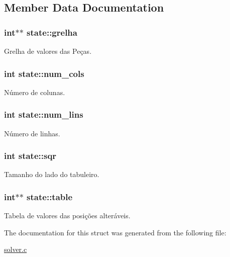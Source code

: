 \subsection{Member Data Documentation}
\hypertarget{structstate_a38d05acc88f631f12c61832a59232fb7}{
\subsubsection[{grelha}]{\setlength{\rightskip}{0pt plus 5cm}int$\ast$$\ast$ state\+::grelha}}\label{structstate_a38d05acc88f631f12c61832a59232fb7}
Grelha de valores das Peças. \hypertarget{structstate_a7fd2fa9e464accceb3da4c76e2198c56}{
\subsubsection[{num\+\_\+cols}]{\setlength{\rightskip}{0pt plus 5cm}int state\+::num\+\_\+cols}}\label{structstate_a7fd2fa9e464accceb3da4c76e2198c56}
Número de colunas. \hypertarget{structstate_a997de7249db5ec85946483c68d0a74a0}{
\subsubsection[{num\+\_\+lins}]{\setlength{\rightskip}{0pt plus 5cm}int state\+::num\+\_\+lins}}\label{structstate_a997de7249db5ec85946483c68d0a74a0}
Número de linhas. \hypertarget{structstate_a9e68c04f3074848d9162c2429a88876b}{
\subsubsection[{sqr}]{\setlength{\rightskip}{0pt plus 5cm}int state\+::sqr}}\label{structstate_a9e68c04f3074848d9162c2429a88876b}
Tamanho do lado do tabuleiro. \hypertarget{structstate_afc35996998683ce23fb7921410d2f0e4}{
\subsubsection[{table}]{\setlength{\rightskip}{0pt plus 5cm}int$\ast$$\ast$ state\+::table}}\label{structstate_afc35996998683ce23fb7921410d2f0e4}
Tabela de valores das posições alteráveis. 

The documentation for this struct was generated from the following file\+:\begin{DoxyCompactItemize}
\item 
\hyperlink{solver_8c}{solver.\+c}\end{DoxyCompactItemize}
